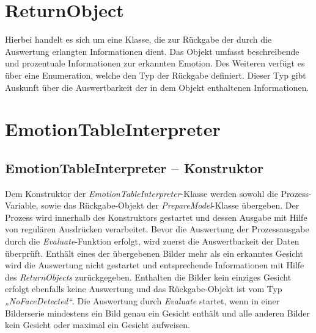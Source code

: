 \documentclass[10pt,a4paper]{report}
\begin{document}
\section{ReturnObject}
Hierbei handelt es sich um eine Klasse, die zur Rückgabe der durch die Auswertung erlangten Informationen dient. Das Objekt umfasst beschreibende und prozentuale Informationen zur erkannten Emotion. Des Weiteren verfügt es über eine Enumeration, welche den Typ der Rückgabe definiert. Dieser Typ gibt Auskunft über die Auswertbarkeit der in dem Objekt enthaltenen Informationen.
\section{EmotionTableInterpreter}
\subsection{EmotionTableInterpreter – Konstruktor}
Dem Konstruktor der \textit{EmotionTableInterpreter}-Klasse werden sowohl die Prozess-Variable, sowie das Rückgabe-Objekt der \textit{PrepareModel}-Klasse übergeben. Der Prozess wird innerhalb des Konstruktors gestartet und dessen Ausgabe mit Hilfe von regulären Ausdrücken verarbeitet. Bevor die Auswertung der Prozessausgabe durch die \textit{Evaluate}-Funktion erfolgt, wird zuerst die Auswertbarkeit der Daten überprüft. Enthält eines der übergebenen Bilder mehr als ein erkanntes Gesicht wird die Auswertung nicht gestartet und entsprechende Informationen mit Hilfe des \textit{ReturnObjects} zurückgegeben. Enthalten die Bilder kein einziges Gesicht erfolgt ebenfalls keine Auswertung und das Rückgabe-Objekt ist vom Typ \textit{„NoFaceDetected“}. Die Auswertung durch \textit{Evaluate} startet, wenn in einer Bilderserie mindestens ein Bild genau ein Gesicht enthält und alle anderen Bilder kein Gesicht oder maximal ein Gesicht aufweisen.
\end{document}
